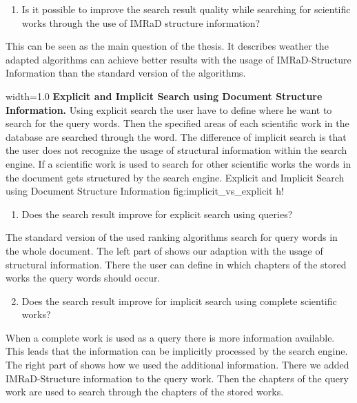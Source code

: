 \begin{enumerate}
  \item Is it possible to improve the search result quality while searching for scientific works through the use of IMRaD structure information?
\end{enumerate}

This can be seen as the main question of the thesis. It describes weather the adapted algorithms can achieve better results with the usage of IMRaD-Structure Information than the standard version of the algorithms.

      {width=1.0\textwidth}
      {\textbf{Explicit and Implicit Search using Document Structure Information.} Using explicit search the user have to define where he want to search for the query words. Then the specified areas of each scientific work in the database are searched through the word. The difference of implicit search is that the user does not recognize the usage of structural information within the search engine. If a scientific work is used to search for other scientific works the words in the document gets structured by the search engine.}
      {Explicit and Implicit Search using Document Structure Information}
      {fig:implicit_vs_explicit}
      {h!}

\begin{enumerate}[label=1.\arabic*]
  \item Does the search result improve for explicit search using queries?
\end{enumerate}

The standard version of the used ranking algorithms search for query words in the whole document. The left part of  shows our adaption with the usage of structural information. There the user can define in which chapters of the stored works the query words should occur.

\begin{enumerate}[label=1.\arabic*]
  \setcounter{enumi}{1}
  \item Does the search result improve for implicit search using complete scientific works?
\end{enumerate}

When a complete work is used as a query there is more information available. This leads that the information can be implicitly processed by the search engine. The right part of  shows how we used the additional information. There we added IMRaD-Structure information to the query work. Then the chapters of the query work are used to search through the chapters of the stored works.

